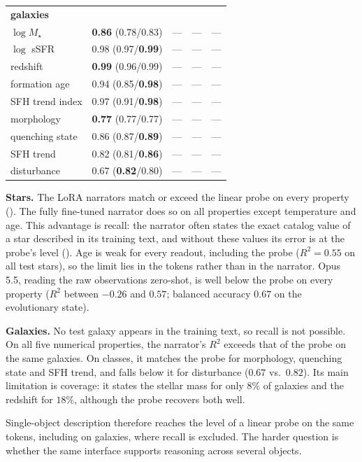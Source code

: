 \begin{table}[t]
\begin{tabular}{lcccc}
\midrule
\multicolumn{5}{l}{\textbf{galaxies}}\\
$\log M_\star$ & \textbf{0.86} (0.78/0.83) & --- & --- & --- \\
$\log$ sSFR & 0.98 (0.97/\textbf{0.99}) & --- & --- & --- \\
redshift & \textbf{0.99} (0.96/0.99) & --- & --- & --- \\
formation age & 0.94 (0.85/\textbf{0.98}) & --- & --- & --- \\
SFH trend index & 0.97 (0.91/\textbf{0.98}) & --- & --- & --- \\
morphology & \textbf{0.77} (0.77/0.77) & --- & --- & --- \\
quenching state & 0.86 (0.87/\textbf{0.89}) & --- & --- & --- \\
SFH trend & 0.82 (0.81/\textbf{0.86}) & --- & --- & --- \\
disturbance & 0.67 (\textbf{0.82}/0.80) & --- & --- & --- \\
\bottomrule
\end{tabular}
\end{table}

\textbf{Stars.} The LoRA narrators match or exceed the linear probe on every property
(). The fully fine-tuned narrator does so on all properties except
temperature and age. This advantage is recall: the narrator often states the exact catalog
value of a star described in its training text, and without these values its error is at the
probe's level (). Age is weak
for every readout, including the probe ($R^2=0.55$ on all test stars), so the limit lies in the tokens rather
than in the narrator. Opus 5.5, reading the raw observations zero-shot, is well below the probe
on every property ($R^2$ between $-0.26$ and $0.57$; balanced accuracy $0.67$ on the
evolutionary state).

\textbf{Galaxies.} No test galaxy appears in the training text, so recall is not possible. On
all five numerical properties, the narrator's $R^2$ exceeds that of the probe on the same
galaxies. On classes, it matches the probe for morphology, quenching state and SFH trend, and
falls below it for disturbance ($0.67$ vs.\ $0.82$).
Its main limitation is coverage: it states the stellar mass for only $8\%$ of galaxies and the
redshift for $18\%$, although the probe recovers both well.

Single-object description therefore reaches the level of a linear probe on the same tokens,
including on galaxies, where recall is excluded. The harder question is whether the same
interface supports reasoning across several objects.

